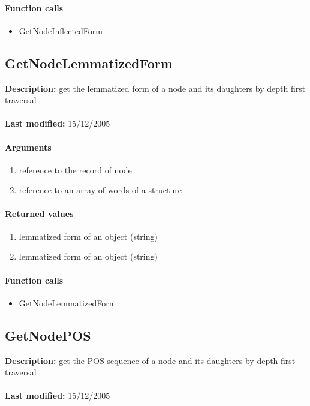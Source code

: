 \paragraph{Function calls}
\begin{itemize}
\item GetNodeInflectedForm
\end{itemize}

\subsection{GetNodeLemmatizedForm}
\textbf{Description:} get the lemmatized form of a node and its daughters by depth first traversal\\
\\\textbf{Last modified:} 15/12/2005

\paragraph{Arguments}
\begin{enumerate}
\item reference to the record of node
\item reference to an array of words of a structure
\end{enumerate}

\paragraph{Returned values}
\begin{enumerate}
\item lemmatized form of an object (string)
\item lemmatized form of an object (string)
\end{enumerate}

\paragraph{Function calls}
\begin{itemize}
\item GetNodeLemmatizedForm
\end{itemize}

\subsection{GetNodePOS}
\textbf{Description:} get the POS sequence of a node and its daughters by depth first traversal\\
\\\textbf{Last modified:} 15/12/2005

